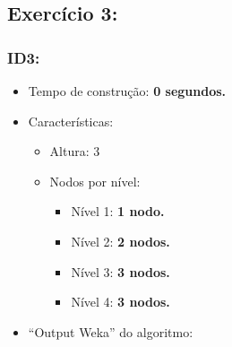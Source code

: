 \documentclass[
    article,            %
    11pt,               %
    oneside,            %
    a4paper,            %
    english,            %
    brazil,             %
    sumario=tradicional,
    ]{abntex2}
\begin{document}
\subsection*{\textbf{Exercício 3:}}

\subsubsection*{\textbf{ID3:}}
    \begin{itemize}
        \item Tempo de construção: \textbf{0 segundos.}
        \item Características:
        \begin{itemize}
            \item Altura: 3
            \item Nodos por nível:
                \begin{itemize}
                    \item Nível 1: \textbf{1 nodo.}
                    \item Nível 2: \textbf{2 nodos.}
                    \item Nível 3: \textbf{3 nodos.}
                    \item Nível 4: \textbf{3 nodos.}
                \end{itemize}
        \end{itemize}
        \item ``Output Weka'' do algoritmo:
    \end{itemize}   
\end{document}
